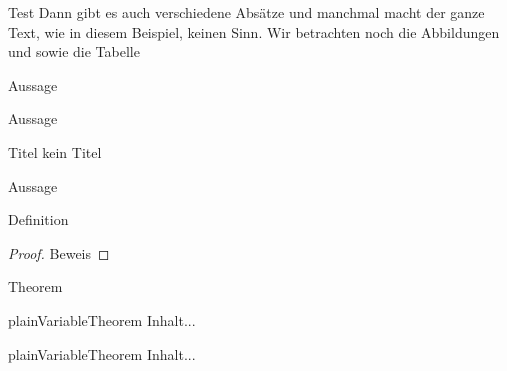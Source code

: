 \documentclass[12pt, bachelor, sepnum, expert]{ur-thesis}
\begin{document}

	
	
	\begin{zusammenfassung}
	Test
	Dann gibt es auch verschiedene Abs\"atze und manchmal macht der ganze Text, wie in diesem Beispiel, keinen Sinn. Wir betrachten noch die Abbildungen
	und 
	sowie die Tabelle \thtitle
	
	
	
	\end{zusammenfassung}
		\tableofcontents
	\begin{lemma}
		Aussage
	\end{lemma}

\begin{satz}
	Aussage
	
	\ifx\thtitle\relax
		Titel
	\else
	 	kein Titel
	\fi
\end{satz}

\begin{bemerkung}
	Aussage \parencite{dehnen2009}
\end{bemerkung}

\begin{definition}
	Definition
\end{definition}



\begin{proof}
	Beweis
\end{proof}

\begin{theorem}
	Theorem
\end{theorem}

\begin{vartheorem}{plain}{VariableTheorem}
	Inhalt...
\end{vartheorem}


\begin{vartheorem}{plain}{VariableTheorem}
	Inhalt...
\end{vartheorem}


\blinddocument
\end{document}
